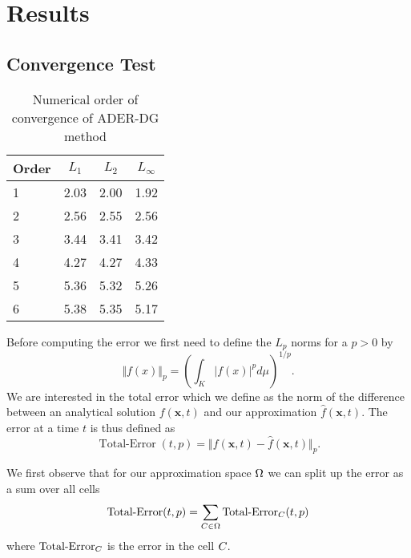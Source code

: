 \chapter{Results}\label{chap:results}
\section{Convergence Test}
\begin{table}[htb]
  \centering
\caption{Numerical order of convergence of ADER-DG method}%
\label{tab:convergence-order}
\begin{tabular}{@{}lS[table-format=1.2]S[table-format=1.2]S[table-format=1.2]@{}}
\toprule
{Order} & {$L_1$} & {$L_2$} & {$L_\infty$}\\  & 2.03 & 2.00 & 1.92\\
2 & 2.56 & 2.55 & 2.56\\
3 & 3.44 & 3.41 & 3.42\\
4 & 4.27 & 4.27 & 4.33\\
5 & 5.36 & 5.32 & 5.26\\
6 & 5.38 & 5.35 & 5.17\\
\bottomrule
\end{tabular}
\end{table}
\newcommand{\error}{\operatorname{Total-Error}}

Before computing the error we first need to define the $L_p$ norms for a $p > 0$ by
\begin{equation}
  \label{eq:Lp-nrom}
  \Vert f(x) \Vert_p = \left( \int_K \vert f(x) \vert^p d\mu  \right)^{1/p}.
\end{equation}
We are interested in the total error which we define as the norm of the difference between an analytical solution $f(\bm{x}, t)$ and our approximation $\hat{f}(\bm{x}, t)$.
The error at a time $t$ is thus defined as
\begin{equation}
  \label{eq:error}
  \error(t,p) = \Vert f(\bm{x}, t) - \hat{f}(\bm{x}, t) \Vert_p.
\end{equation}

We first observe that for our approximation space $\broken$ we can split up the error as a sum over all cells
\begin{equation}
  \label{eq:lp-norm-broken}
  \error(t,p) = \sum_{\cell[] \in \broken} \error_{\cell[]}(t,p)
\end{equation}
where $\error_{\cell[]}$ is the error in the cell $\cell[]$.

